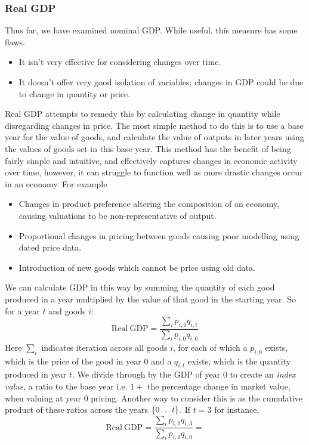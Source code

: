 \documentclass[12pt]{report}
\begin{document}
\begin{flushleft}
\subsubsection*{Real GDP}
Thus far, we have examined nominal GDP. While useful, this measure has some 
flaws.
\begin{itemize}
    \item It isn't very effective for considering changes over time.
    \item It doesn't offer very good isolation of variables; changes in GDP
        could be due to change in quantity or price.
\end{itemize}
Real GDP attempts to remedy this by calculating change in quantity while 
disregarding changes in price. The most simple method to do this is to use a
base year for the value of goods, and calculate the value of outputs in later
years using the values of goods set in this base year. This method has the 
benefit of being fairly simple and intuitive, and effectively captures changes
in economic activity over time, however, it can struggle to function well as
more drastic changes occur in an economy. For example
\begin{itemize}
    \item Changes in product preference altering the composition of an economy,
        causing valuations to be non-representative of output.
    \item Proportional changes in pricing between goods causing poor modelling
        using dated price data.
    \item Introduction of new goods which cannot be price using old data.
\end{itemize}
We can calculate GDP in this way by summing the quantity of each good produced
in a year multiplied by the value of that good in the starting year. So for
a year \(t\) and goods \(i\):
\[\mathrm{Real}\:\mathrm{GDP} 
    = \frac{\sum_i p_{i,0}q_{i,t}}{\sum_i p_{i,0}q_{i,0}}\]
Here \(\sum_i\) indicates iteration across all goods \(i\), for each of which
a \(p_{i,0}\) exists, which is the price of the good in year \(0\) and a 
\(q_{i,t}\) exists, which is the quantity produced in year \(t\). We divide 
through by the GDP of year \(0\) to create an \textit{index value}, a ratio
to the base year i.e. \(1 +\) the percentage change in market value, when 
valuing at year \(0\) pricing. Another way to consider this is as the 
cumulative product of these ratios across the years \(\set{0 \ldots t}\).
If \(t = 3\) for instance,
\[\mathrm{Real}\:\mathrm{GDP} 
= \frac{\sum_i p_{i,0}q_{i,3}}{\sum_i p_{i,0}q_{i,0}} = 
\]
\end{flushleft}
\end{document}
